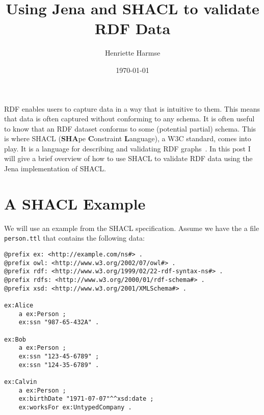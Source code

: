 \documentclass{amsart}
\title{Using Jena and SHACL to validate RDF Data}
\author{Henriette Harmse}
\date{\today}
\begin{document}
  \maketitle
  
  RDF enables users to capture data in a way that is intuitive to them. This means that data is often captured without conforming to any schema. It is often useful to know that an RDF dataset conforms to some (potential partial) schema. This is where SHACL (\textbf{SHA}pe \textbf{C}onstraint \textbf{L}anguage), a W3C standard, comes into play. It is a language for describing and validating RDF graphs~\cite{SHACL-2017}. In this post I will give a brief overview of how to use SHACL to validate RDF data using the Jena implementation of SHACL.
  
  \section{A SHACL Example}
  We will use an example from the SHACL specification. Assume we have the a file \texttt{person.ttl} that contains the following data:
  
  \begin{small}
  \begin{Verbatim}
@prefix ex: <http://example.com/ns#> .
@prefix owl: <http://www.w3.org/2002/07/owl#> .
@prefix rdf: <http://www.w3.org/1999/02/22-rdf-syntax-ns#> .
@prefix rdfs: <http://www.w3.org/2000/01/rdf-schema#> .
@prefix xsd: <http://www.w3.org/2001/XMLSchema#> .

ex:Alice
	a ex:Person ;
	ex:ssn "987-65-432A" .
  
ex:Bob
	a ex:Person ;
	ex:ssn "123-45-6789" ;
	ex:ssn "124-35-6789" .
  
ex:Calvin
	a ex:Person ;
	ex:birthDate "1971-07-07"^^xsd:date ;
	ex:worksFor ex:UntypedCompany .     
  \end{Verbatim}
  \end{small}
  
\vspace{5mm}
\end{document}
